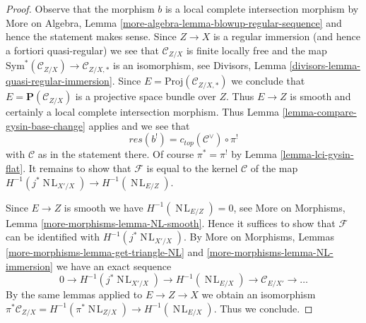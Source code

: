 \documentclass[10pt,a4paper]{amsart}
\theoremstyle{plain}
\theoremstyle{definition}
\theoremstyle{remark}
\numberwithin{equation}{subsection}
\def\NL{\mathop{N\!L}\nolimits}
\begin{document}
\begin{proof}
Observe that the morphism $b$ is a local complete intersection morphism
by More on Algebra, Lemma \ref{more-algebra-lemma-blowup-regular-sequence}
and hence the statement makes sense. Since $Z \to X$ is a regular
immersion (and hence a fortiori quasi-regular) we see that $\mathcal{C}_{Z/X}$
is finite locally free and the map
$\text{Sym}^*(\mathcal{C}_{Z/X}) \to \mathcal{C}_{Z/X, *}$
is an isomorphism, see
Divisors, Lemma \ref{divisors-lemma-quasi-regular-immersion}.
Since $E = \text{Proj}(\mathcal{C}_{Z/X, *})$ we conclude
that $E = \mathbf{P}(\mathcal{C}_{Z/X})$
is a projective space bundle over $Z$.
Thus $E \to Z$ is smooth and certainly a local complete intersection
morphism. Thus Lemma \ref{lemma-compare-gysin-base-change}
applies and we see that
$$
res(b^!) = c_{top}(\mathcal{C}^\vee) \circ \pi^!
$$
with $\mathcal{C}$ as in the statement there.
Of course $\pi^* = \pi^!$ by Lemma \ref{lemma-lci-gysin-flat}.
It remains to show that $\mathcal{F}$ is equal to
the kernel $\mathcal{C}$ of the map
$H^{-1}(j^*\NL_{X'/X}) \to H^{-1}(\NL_{E/Z})$.

\medskip\noindent
Since $E \to Z$ is smooth we have $H^{-1}(\NL_{E/Z}) = 0$, see
More on Morphisms, Lemma \ref{more-morphisms-lemma-NL-smooth}.
Hence it suffices to show that $\mathcal{F}$ can be identified
with $H^{-1}(j^*\NL_{X'/X})$. By More on Morphisms, Lemmas
\ref{more-morphisms-lemma-get-triangle-NL} and
\ref{more-morphisms-lemma-NL-immersion} we have an exact sequence
$$
0 \to H^{-1}(j^*\NL_{X'/X}) \to H^{-1}(\NL_{E/X}) \to
\mathcal{C}_{E/X'} \to \ldots
$$
By the same lemmas applied to $E \to Z \to X$ we obtain an isomorphism
$\pi^*\mathcal{C}_{Z/X} = H^{-1}(\pi^*\NL_{Z/X}) \to H^{-1}(\NL_{E/X})$.
Thus we conclude.
\end{proof}
\end{document}
